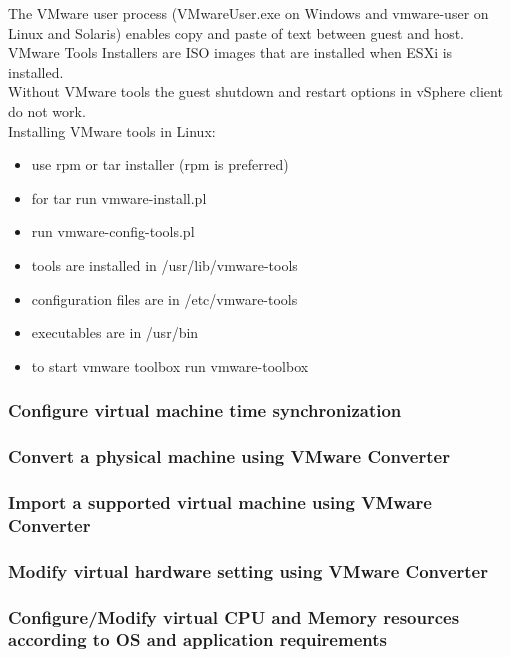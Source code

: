 The VMware user process (VMwareUser.exe on Windows and vmware-user on Linux
and Solaris) enables copy and paste of text between guest and host.\\

VMware Tools Installers are ISO images that are installed when ESXi is
installed.\\

Without VMware tools the guest shutdown and restart options in vSphere client
do not work.\\

Installing VMware tools in Linux:

\begin{itemize}
\item use rpm or tar installer (rpm is preferred)
\item for tar run vmware-install.pl
\item run vmware-config-tools.pl
\item tools are installed in /usr/lib/vmware-tools
\item configuration files are in /etc/vmware-tools
\item executables are in /usr/bin
\item to start vmware toolbox run vmware-toolbox
\end{itemize}

\subsubsection{Configure virtual machine time synchronization}

\subsubsection{Convert a physical machine using VMware Converter}

\subsubsection{Import a supported virtual machine using VMware Converter}

\subsubsection{Modify virtual hardware setting using VMware Converter}

\subsubsection{Configure/Modify virtual CPU and Memory resources according to OS and application requirements}

